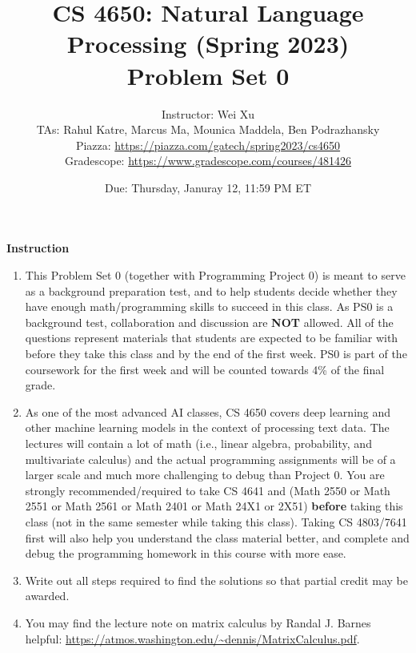 \documentclass[11pt, letterpaper]{article}
\begin{document}
\title{CS 4650: Natural Language Processing (Spring 2023) \\ Problem Set 0}
\author{Instructor: Wei Xu \\ TAs: Rahul Katre, Marcus Ma, Mounica Maddela, Ben Podrazhansky
\\Piazza: \url{https://piazza.com/gatech/spring2023/cs4650}
\\Gradescope: \url{https://www.gradescope.com/courses/481426}}
\date{Due: Thursday, Januray 12, 11:59 PM ET}
\maketitle

{\Large \textbf{Instruction}}
\begin{enumerate}
    \item This Problem Set 0 (together with Programming Project 0) is meant to serve as a background preparation test, and to help students decide whether they have enough math/programming skills to succeed in this class. As PS0 is a background test, collaboration and discussion are \textbf{NOT} allowed. All of the questions represent materials that students are expected to be familiar with before they take this class and by the end of the first week. PS0 is part of the coursework for the first week and will be counted towards 4\%  of the final grade. 
    
    \item As one of the most advanced AI classes, CS 4650 covers deep learning and other machine learning models in the context of processing text data. The lectures will contain a lot of math (i.e., linear algebra, probability, and multivariate calculus) and the actual programming assignments will be of a larger scale and much more challenging to debug than Project 0. You are strongly recommended/required to take CS 4641  and (Math 2550 or Math 2551 or Math 2561 or Math 2401 or Math 24X1 or 2X51) \textbf{before} taking this class (not in the same semester while taking this class). Taking CS 4803/7641 first will also help you understand the class material better, and complete and debug the programming homework in this course with more ease.

    
    \item Write out all steps required to find the solutions so that partial credit may be awarded.
    
    \item You may find the lecture note on matrix calculus by Randal J. Barnes helpful: \url{https://atmos.washington.edu/~dennis/MatrixCalculus.pdf}. 
    

\end{enumerate}
\end{document}
